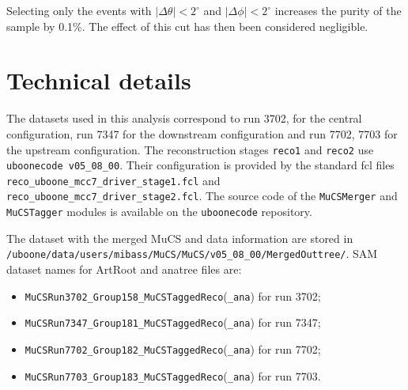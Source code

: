 \documentclass[a4paper]{scrartcl}
\begin{document}
Selecting only the events with $|\Delta\theta| < 2^{\circ}$ and $|\Delta\phi| < 2^{\circ}$ increases the purity of the sample by 0.1\%. The effect of this cut has then been considered negligible.

\section{Technical details}
The datasets used in this analysis correspond to run 3702, for the central configuration, run 7347 for the downstream configuration and run 7702, 7703 for the upstream configuration. The reconstruction stages \texttt{reco1} and \texttt{reco2} use \texttt{uboonecode v05\_08\_00}. Their configuration is provided by the standard fcl files \texttt{reco\_uboone\_mcc7\_driver\_stage1.fcl} and \texttt{reco\_uboone\_mcc7\_driver\_stage2.fcl}. The source code of the \texttt{MuCSMerger} and \texttt{MuCSTagger} modules is available on the \texttt{uboonecode} repository.

The dataset with the merged MuCS and data information are stored in \texttt{/uboone/\allowbreak data/\allowbreak users/\allowbreak mibass/MuCS/MuCS/v05\_08\_00/MergedOuttree/}.
SAM dataset names for ArtRoot and anatree files are:
\begin{itemize}
  \item \texttt{MuCSRun3702\_Group158\_MuCSTaggedReco}(\texttt{\_ana}) for run 3702;
  \item \texttt{MuCSRun7347\_Group181\_MuCSTaggedReco}(\texttt{\_ana}) for run 7347;
  \item \texttt{MuCSRun7702\_Group182\_MuCSTaggedReco}(\texttt{\_ana}) for run 7702;
  \item \texttt{MuCSRun7703\_Group183\_MuCSTaggedReco}(\texttt{\_ana}) for run 7703.

\end{itemize}

\clearpage{}
\end{document}
